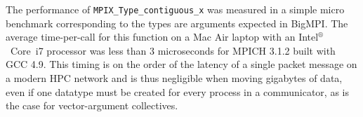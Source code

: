 The performance of \texttt{MPIX\_Type\_contiguous\_x} was measured
in a simple micro benchmark corresponding to the types are arguments
expected in BigMPI.
The average time-per-call for this function on a Mac Air laptop with an 
Intel${}^\circledR$~Core\texttrademark~i7 processor was less than
3 microseconds for MPICH 3.1.2 built with GCC 4.9.
This timing is on the order of the latency of a single packet message
on a modern HPC network and is thus negligible when moving gigabytes
of data, even if one datatype must be created for every process 
in a communicator, as is the case for vector-argument collectives.


